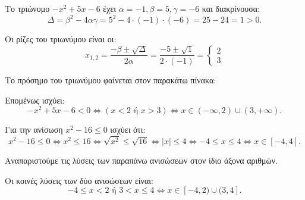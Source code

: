 
\begin{alist}
\item Το τριώνυμο $-x^2 + 5x - 6$ έχει $\alpha = -1, \beta = 5, \gamma = -6$ και διακρίνουσα:
\[\Delta = \beta^2 - 4\alpha\gamma = 5^2 - 4 \cdot (-1) \cdot (-6) = 25 - 24 = 1 > 0.\]

Οι ρίζες του τριωνύμου είναι οι:
\[x_{1,2} = \dfrac{-\beta \pm \sqrt{\Delta}}{2\alpha} = \dfrac{-5 \pm \sqrt{1}}{2 \cdot (-1)} = \begin{cases} 2 \\ 3 \end{cases}\]

Το πρόσημο του τριωνύμου φαίνεται στον παρακάτω πίνακα:
\begin{center}
\end{center}

Επομένως ισχύει:
\[-x^2 + 5x - 6 < 0 \Leftrightarrow (x < 2 \text{ ή } x > 3) \Leftrightarrow x \in (-\infty, 2) \cup (3, +\infty).\]

Για την ανίσωση $x^2 - 16 \le 0$ ισχύει ότι:
\[x^2 - 16 \le 0 \Leftrightarrow x^2 \le 16 \Leftrightarrow \sqrt{x^2} \le \sqrt{16} \Leftrightarrow |x| \le 4 \Leftrightarrow -4 \le x \le 4 \Leftrightarrow x \in [-4, 4].\]

\item Αναπαριστούμε τις λύσεις των παραπάνω ανισώσεων στον ίδιο άξονα αριθμών.

Οι κοινές λύσεις των δύο ανισώσεων είναι:
\[-4 \le x < 2 \text{ ή } 3 < x \le 4 \Leftrightarrow x \in [-4, 2) \cup (3, 4].\]
\end{alist}

